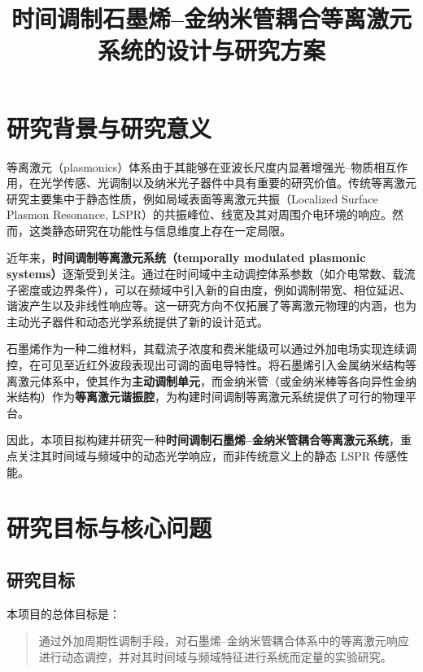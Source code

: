 \documentclass[12pt,a4paper]{article}
\title{\textbf{时间调制石墨烯–金纳米管耦合等离激元系统的设计与研究方案}}
\author{}
\date{}
\begin{document}
\maketitle
\onehalfspacing

\section{研究背景与研究意义}

等离激元（plasmonics）体系由于其能够在亚波长尺度内显著增强光–物质相互作用，在光学传感、光调制以及纳米光子器件中具有重要的研究价值。传统等离激元研究主要集中于静态性质，例如局域表面等离激元共振（Localized Surface Plasmon Resonance, LSPR）的共振峰位、线宽及其对周围介电环境的响应。然而，这类静态研究在功能性与信息维度上存在一定局限。

近年来，\textbf{时间调制等离激元系统（temporally modulated plasmonic systems）}逐渐受到关注。通过在时间域中主动调控体系参数（如介电常数、载流子密度或边界条件），可以在频域中引入新的自由度，例如调制带宽、相位延迟、谐波产生以及非线性响应等。这一研究方向不仅拓展了等离激元物理的内涵，也为主动光子器件和动态光学系统提供了新的设计范式。

石墨烯作为一种二维材料，其载流子浓度和费米能级可以通过外加电场实现连续调控，在可见至近红外波段表现出可调的面电导特性。将石墨烯引入金属纳米结构等离激元体系中，使其作为\textbf{主动调制单元}，而金纳米管（或金纳米棒等各向异性金纳米结构）作为\textbf{等离激元谐振腔}，为构建时间调制等离激元系统提供了可行的物理平台。

因此，本项目拟构建并研究一种\textbf{时间调制石墨烯–金纳米管耦合等离激元系统}，重点关注其时间域与频域中的动态光学响应，而非传统意义上的静态 LSPR 传感性能。

\section{研究目标与核心问题}

\subsection{研究目标}

本项目的总体目标是：

\begin{quote}
通过外加周期性调制手段，对石墨烯–金纳米管耦合体系中的等离激元响应进行动态调控，并对其时间域与频域特征进行系统而定量的实验研究。
\end{quote}
\end{document}
